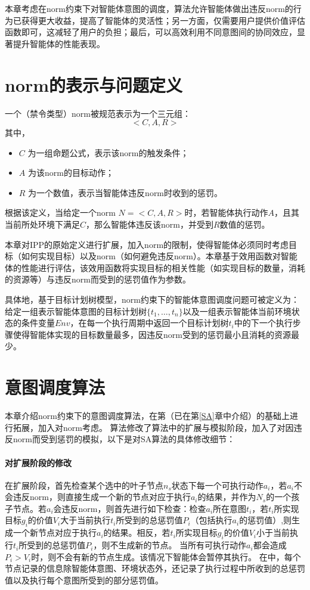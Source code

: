 本章考虑在norm约束下对智能体意图的调度，\SAN 算法允许智能体做出违反norm的行为已获得更大收益，提高了智能体的灵活性；另一方面，\SAN 仅需要用户提供价值评估函数即可，这减轻了用户的负担；最后，\SAN 可以高效利用不同意图间的协同效应，显著提升智能体的性能表现。

\section{norm的表示与问题定义}
一个（禁令类型）norm被规范表示为一个三元组：
$$<C,A,R>$$
其中，
\begin{itemize}
  \item $C$ 为一组命题公式，表示该norm的触发条件；
  \item $A$ 为该norm的目标动作；
  \item $R$ 为一个数值，表示当智能体违反norm时收到的惩罚。
\end{itemize}

根据该定义，当给定一个norm $N=<C,A,R>$时，若智能体执行动作$A$，且其当前所处环境下满足$C$，那么智能体违反该norm，并受到$R$数值的惩罚。

本章对IPP的原始定义进行扩展，加入norm的限制，使得智能体必须同时考虑目标（如何实现目标）以及norm（如何避免违反norm）。本章基于效用函数对智能体的性能进行评估，该效用函数将实现目标的相关性能（如实现目标的数量，消耗的资源等）与违反norm而受到的惩罚值作为参数。

具体地，基于目标计划树模型，norm约束下的智能体意图调度问题可被定义为：给定一组表示智能体意图的目标计划树$\{t_1, \dots, t_n\}$以及一组表示智能体当前环境状态的条件变量$Env$，在每一个执行周期中返回一个目标计划树$t_i$中的下一个执行步骤使得智能体实现的目标数量最多，因违反norm受到的惩罚最小且消耗的资源最少。

\section{\SAN 意图调度算法}
本章介绍norm约束下的意图调度算法\SAN，\SAN 在第\SA （已在第\ref{SA}章中介绍）的基础上进行拓展，加入对norm考虑。
\SAN 算法修改了\SA 算法中的扩展与模拟阶段，加入了对因违反norm而受到惩罚的模拟，以下是对SA算法的具体修改细节：
\paragraph{对扩展阶段的修改}
在扩展阶段，\SAN 首先检查某个选中的叶子节点$n_s$状态下每一个可执行动作$a_i$，若$a_i$不会违反norm，则直接生成一个新的节点对应于执行$a_i$的结果，并作为$N_s$的一个孩子节点。若$a_i$会违反norm，则首先进行如下检查：检查$a_i$所在意图$t_i$，若$t_i$所实现目标$g_i$的价值$V_i$大于当前执行$t_i$所受到的总惩罚值$P_i$（包括执行$a_i$的惩罚值）,则生成一个新节点对应于执行$a_i$的结果。相反，若$t_i$所实现目标$g_i$的价值$V_i$小于当前执行$t_i$所受到的总惩罚值$P_i$，则不生成新的节点。
%
当所有可执行动作$a_i$都会造成$P_i > V_i$时，则不会有新的节点生成。该情况下智能体会暂停其执行。
%
在\SAN 中，每个节点记录的信息除智能体意图、环境状态外，还记录了执行过程中所收到的总惩罚值以及执行每个意图所受到的部分惩罚值。

